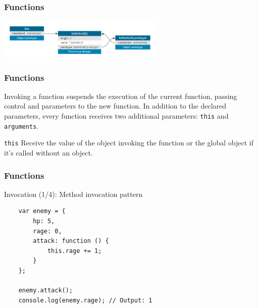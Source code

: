 \begin{frame}[fragile]
  \frametitle{Functions}
  \begin{center}
    \includegraphics[width=300px]{images/function_prototype.png}
  \end{center}
\end{frame}

\begin{frame}[fragile]
  \frametitle{Functions}

  Invoking a function suspends the execution of the current function, passing control and parameters to the new function. In addition to the declared parameters, every function receives two additional parameters: \texttt{this} and \texttt{arguments}.

  \pause

  \begin{block}{\texttt{this}}
    Receive the value of the object invoking the function or the global object if it's called without an object.
  \end{block}

\end{frame}

\begin{frame}[fragile]
  \frametitle{Functions}
  \begin{block}{Invocation (1/4): Method invocation pattern}
    {\scriptsize
    \begin{verbatim}
    var enemy = {
        hp: 5,
        rage: 0,
        attack: function () {
            this.rage += 1;
        }
    };

    enemy.attack();
    console.log(enemy.rage); // Output: 1
    \end{verbatim}
    }
  \end{block}
\end{frame}

